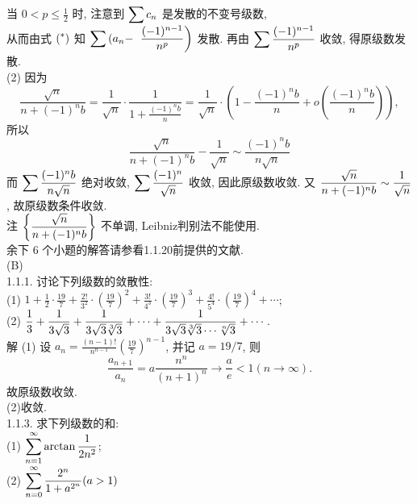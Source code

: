 \documentclass[a4paper,11pt,UTF8]{article}
\begin{document}
当 $0<p \leq \frac{1}{2}$ 时, 注意到 $\displaystyle \displaystyle \displaystyle \sum c_n$ 是发散的不变号级数,\\
 从而由式 $\displaystyle \displaystyle \displaystyle \left(^*\right)$ 知 $\displaystyle \displaystyle \displaystyle \sum\left(a_n-\right.$ $\displaystyle \displaystyle \displaystyle \left.\frac{(-1)^{n-1}}{n^p}\right)$ 发散. 再由 $\displaystyle \displaystyle \displaystyle \sum \frac{(-1)^{n-1}}{n^p}$ 收敛, 得原级数发散.\\
(2) 因为
$$
\frac{\sqrt{n}}{n+(-1)^n b}=\frac{1}{\sqrt{n}} \cdot \frac{1}{1+\frac{(-1)^n b}{n}}=\frac{1}{\sqrt{n}} \cdot\left(1-\frac{(-1)^n b}{n}+o\left(\frac{(-1)^n b}{n}\right)\right),
$$
所以
$$
\frac{\sqrt{n}}{n+(-1)^n b}-\frac{1}{\sqrt{n}} \sim \frac{(-1)^n b}{n \sqrt{n}}
$$
而 $\displaystyle \displaystyle \displaystyle \sum \frac{(-1)^n b}{n \sqrt{n}}$ 绝对收敛, $\displaystyle \displaystyle \displaystyle \sum \frac{(-1)^n}{\sqrt{n}}$ 收敛, 因此原级数收敛. 又 $\displaystyle \displaystyle \displaystyle \frac{\sqrt{n}}{n+(-1)^n b} \sim \frac{1}{\sqrt{n}}$, 故原级数条件收敛.\\
注 $\displaystyle \displaystyle \displaystyle \left\{\frac{\sqrt{n}}{n+(-1)^n b}\right\}$ 不单调, Leibniz判别法不能使用.\\
余下 6 个小题的解答请参看1.1.20前提供的文献.\\
(B)\\
1.1.1. 讨论下列级数的敛散性:\\
(1) $1+\frac{1}{2} \cdot \frac{19}{7}+\frac{2 !}{3^2} \cdot\left(\frac{19}{7}\right)^2+\frac{3 !}{4^3} \cdot\left(\frac{19}{7}\right)^3+\frac{4 !}{5^4} \cdot\left(\frac{19}{7}\right)^4+\cdots$;\\
(2) $\displaystyle \displaystyle \displaystyle \frac{1}{3}+\frac{1}{3 \sqrt{3}}+\frac{1}{3 \sqrt{3} \sqrt[3]{3}}+\cdots+\frac{1}{3 \sqrt{3} \sqrt[3]{3} \cdots \sqrt[n]{3}}+\cdots$.\\
解 (1) 设 $a_n=\frac{(n-1) !}{n^{n-1}}\left(\frac{19}{7}\right)^{n-1}$, 并记 $a=19 / 7$, 则
$$
\frac{a_{n+1}}{a_n}=a \frac{n^n}{(n+1)^n} \rightarrow \frac{a}{e}<1(n \rightarrow \infty) .
$$
故原级数收敛.\\
(2)收敛.\\
1.1.3. 求下列级数的和:\\
(1) $\displaystyle \displaystyle \displaystyle \sum_{n=1}^{\infty} \arctan \frac{1}{2 n^2}$;\\
(2) $\displaystyle \displaystyle \displaystyle \sum_{n=0}^{\infty} \frac{2^n}{1+a^{2^n}}(a>1)$\\
\end{document}
